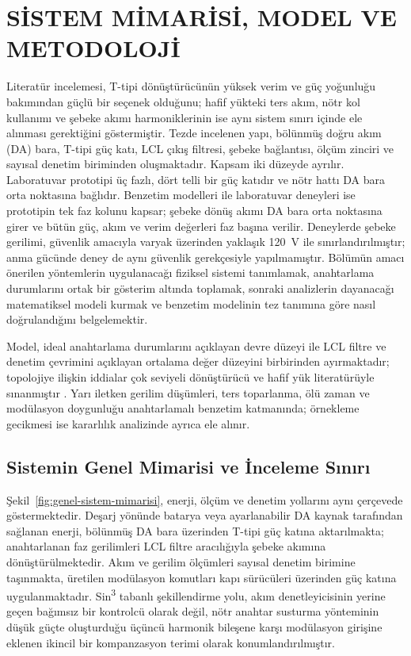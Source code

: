 \chapter{SİSTEM MİMARİSİ, MODEL VE METODOLOJİ}
\label{chap:sistem}


Literatür incelemesi, T-tipi dönüştürücünün yüksek verim ve güç yoğunluğu bakımından güçlü bir seçenek olduğunu; hafif yükteki ters akım, nötr kol kullanımı ve şebeke akımı harmoniklerinin ise aynı sistem sınırı içinde ele alınması gerektiğini göstermiştir. Tezde incelenen yapı, bölünmüş doğru akım (DA) bara, T-tipi güç katı, LCL çıkış filtresi, şebeke bağlantısı, ölçüm zinciri ve sayısal denetim biriminden oluşmaktadır. Kapsam iki düzeyde ayrılır. Laboratuvar prototipi üç fazlı, dört telli bir güç katıdır ve nötr hattı DA bara orta noktasına bağlıdır. Benzetim modelleri ile laboratuvar deneyleri ise prototipin tek faz kolunu kapsar; şebeke dönüş akımı DA bara orta noktasına girer ve bütün güç, akım ve verim değerleri faz başına verilir. Deneylerde şebeke gerilimi, güvenlik amacıyla varyak üzerinden yaklaşık \SI{120}{\volt} ile sınırlandırılmıştır; anma gücünde deney de aynı güvenlik gerekçesiyle yapılmamıştır. Bölümün amacı önerilen yöntemlerin uygulanacağı fiziksel sistemi tanımlamak, anahtarlama durumlarını ortak bir gösterim altında toplamak, sonraki analizlerin dayanacağı matematiksel modeli kurmak ve benzetim modelinin tez tanımına göre nasıl doğrulandığını belgelemektir.

Model, ideal anahtarlama durumlarını açıklayan devre düzeyi ile LCL filtre ve denetim çevrimini açıklayan ortalama değer düzeyini birbirinden ayırmaktadır; topolojiye ilişkin iddialar çok seviyeli dönüştürücü ve hafif yük literatürüyle sınanmıştır \citep{Mohan2003,Holmes2003,Schweizer2013,Wang2020,Chen2010}. Yarı iletken gerilim düşümleri, ters toparlanma, ölü zaman ve modülasyon doygunluğu anahtarlamalı benzetim katmanında; örnekleme gecikmesi ise kararlılık analizinde ayrıca ele alınır.

\section{Sistemin Genel Mimarisi ve İnceleme Sınırı}

Şekil~\ref{fig:genel-sistem-mimarisi}, enerji, ölçüm ve denetim yollarını aynı çerçevede göstermektedir. Deşarj yönünde batarya veya ayarlanabilir DA kaynak tarafından sağlanan enerji, bölünmüş DA bara üzerinden T-tipi güç katına aktarılmakta; anahtarlanan faz gerilimleri LCL filtre aracılığıyla şebeke akımına dönüştürülmektedir. Akım ve gerilim ölçümleri sayısal denetim birimine taşınmakta, üretilen modülasyon komutları kapı sürücüleri üzerinden güç katına uygulanmaktadır. Sin\textsuperscript{3} tabanlı şekillendirme yolu, akım denetleyicisinin yerine geçen bağımsız bir kontrolcü olarak değil, nötr anahtar susturma yönteminin düşük güçte oluşturduğu üçüncü harmonik bileşene karşı modülasyon girişine eklenen ikincil bir kompanzasyon terimi olarak konumlandırılmıştır.

